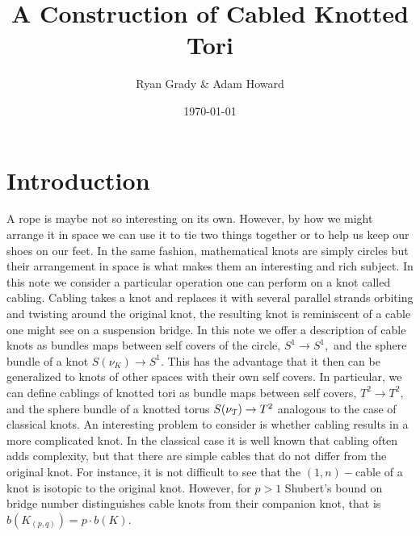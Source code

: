 \documentclass[a4paper, 12 pt, reqno]{amsart}
\title{A Construction of Cabled Knotted Tori}
\author{Ryan Grady \& Adam Howard}
\date{\today}
\theoremstyle{definition}
\theoremstyle{remark}
\begin{document}
\maketitle


\section{Introduction}\label{sec.intro}
A rope is maybe not so interesting on its own. However, by how we might arrange it in space we can use it to tie two things together or to help us keep our shoes on our feet. In the same fashion, mathematical knots are simply circles but their arrangement in space is what makes them an interesting and rich subject. In this note we consider a particular operation one can perform on a knot called cabling. Cabling takes a knot and replaces it with several parallel strands orbiting and twisting around the original knot, the resulting knot is reminiscent of a cable one might see on a suspension bridge. \newline 
\indent In this note we offer a description of cable knots as bundles maps between self covers of the circle, $S^{1} \rightarrow S^{1},$ and the sphere bundle of a knot $S(\nu_{K}) \rightarrow S^{1}.$ This has the advantage that it then can be generalized to knots of other spaces with their own self covers. In particular, we can define cablings of knotted tori as bundle maps between self covers, $T^{2} \rightarrow T^{2},$ and the sphere bundle of a knotted torus $S(\nu_{\mathcal T}) \rightarrow T^{2}$ analogous to the case of classical knots. \newline \indent An interesting problem to consider is whether cabling results in a more complicated knot. In the classical case it is well known that cabling often adds complexity, but that there are simple cables that do not differ from the original knot. For instance, it is not difficult to see that the $(1, n)-$cable of a knot is isotopic to the original knot. However, for $p > 1$ Shubert's bound on bridge number distinguishes cable knots from their companion knot, that is $b(K_{(p, q)}) = p \cdot b(K)$. 
\end{document}
